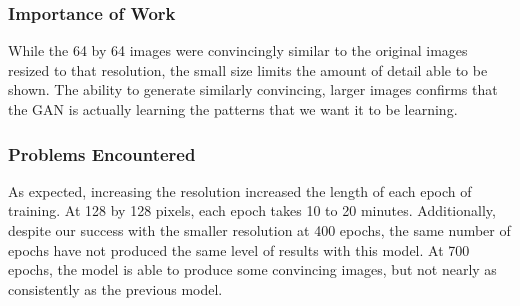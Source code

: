 \documentclass[11pt,letterpaper]{article}
\begin{document}
			\subsubsection{Importance of Work}
				While the 64 by 64 images were convincingly similar to the original images resized to that resolution, the small size limits the amount of detail able to be shown.
				The ability to generate similarly convincing, larger images confirms that the GAN is actually learning the patterns that we want it to be learning.

			\subsubsection{Problems Encountered}
				As expected, increasing the resolution increased the length of each epoch of training.
				At 128 by 128 pixels, each epoch takes 10 to 20 minutes.
				Additionally, despite our success with the smaller resolution at 400 epochs, the same number of epochs have not produced the same level of results with this model.
				At 700 epochs, the model is able to produce some convincing images, but not nearly as consistently as the previous model.




\nocite{*}
\end{document}
